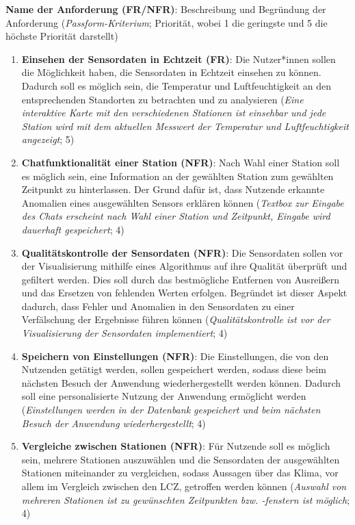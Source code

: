 \textbf{Name der Anforderung (FR/NFR)}: Beschreibung und Begründung der Anforderung (\textit{Passform-Kriterium}; Priorität, wobei 1 die geringste und 5 die höchste Priorität darstellt)

\begin{enumerate}
    \item \textbf{Einsehen der Sensordaten in Echtzeit (FR)}: Die Nutzer*innen sollen die Möglichkeit haben, die Sensordaten in Echtzeit einsehen zu können. Dadurch soll es möglich sein, die Temperatur und Luftfeuchtigkeit an den entsprechenden Standorten zu betrachten und zu analysieren (\textit{Eine interaktive Karte mit den verschiedenen Stationen ist einsehbar und jede Station wird mit dem aktuellen Messwert der Temperatur und Luftfeuchtigkeit angezeigt}; 5)
    \item \textbf{Chatfunktionalität einer Station (NFR)}: Nach Wahl einer Station soll es möglich sein, eine Information an der gewählten Station zum gewählten Zeitpunkt zu hinterlassen. Der Grund dafür ist, dass Nutzende erkannte Anomalien eines ausgewählten Sensors erklären können (\textit{Textbox zur Eingabe des Chats erscheint nach Wahl einer Station und Zeitpunkt, Eingabe wird dauerhaft gespeichert}; 4)
    \item \textbf{Qualitätskontrolle der Sensordaten (NFR)}: Die Sensordaten sollen vor der Visualisierung mithilfe eines Algorithmus auf ihre Qualität überprüft und gefiltert werden. Dies soll durch das bestmögliche Entfernen von Ausreißern und das Ersetzen von fehlenden Werten erfolgen. Begründet ist dieser Aspekt dadurch, dass Fehler und Anomalien in den Sensordaten zu einer Verfälschung der Ergebnisse führen können (\textit{Qualitätskontrolle ist vor der Visualisierung der Sensordaten implementiert}; 4)
    \item \textbf{Speichern von Einstellungen (NFR)}: Die Einstellungen, die von den Nutzenden getätigt werden, sollen gespeichert werden, sodass diese beim nächsten Besuch der Anwendung wiederhergestellt werden können. Dadurch soll eine personalisierte Nutzung der Anwendung ermöglicht werden (\textit{Einstellungen werden in der Datenbank gespeichert und beim nächsten Besuch der Anwendung wiederhergestellt}; 4)
    \item \textbf{Vergleiche zwischen Stationen (NFR)}: Für Nutzende soll es möglich sein, mehrere Stationen auszuwählen und die Sensordaten der ausgewählten Stationen miteinander zu vergleichen, sodass Aussagen über das Klima, vor allem im Vergleich zwischen den \ac{LCZ}, getroffen werden können (\textit{Auswahl von mehreren Stationen ist zu gewünschten Zeitpunkten bzw. -fenstern ist möglich}; 4)

\end{enumerate}
